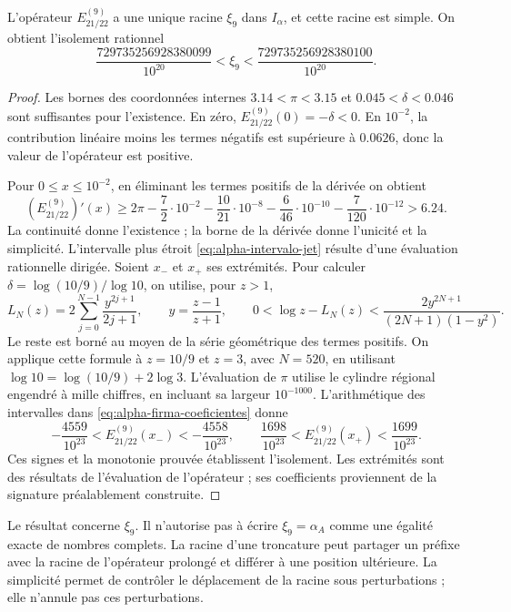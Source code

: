 \begin{proposition}
\label{prop:alpha-raiz-jet}
L'opérateur \(E_{21/22}^{(9)}\) a une unique racine \(\xi_9\) dans \(I_\alpha\), et cette racine est simple. On obtient l'isolement rationnel
\begin{equation}
 \frac{729735256928380099}{10^{20}}
 <\xi_9<\frac{729735256928380100}{10^{20}}.
 \label{eq:alpha-intervalo-jet}
\end{equation}
\end{proposition}

\begin{proof}
Les bornes des coordonnées internes
\(3.14<\pi<3.15\) et
\(0.045<\delta<0.046\) sont suffisantes pour l'existence. En zéro,
\(E_{21/22}^{(9)}(0)=-\delta<0\). En \(10^{-2}\), la contribution
linéaire moins les termes négatifs est supérieure à \(0.0626\), donc la
valeur de l'opérateur est positive.

Pour \(0\leq x\leq10^{-2}\), en éliminant les termes positifs de
la dérivée on obtient
\[
 (E_{21/22}^{(9)})'(x)
 \geq2\pi-\frac72\cdot10^{-2}
 -\frac{10}{21}\cdot10^{-8}-\frac6{46}\cdot10^{-10}
 -\frac7{120}\cdot10^{-12}>6.24.
\]
La continuité donne l'existence ; la borne de la dérivée donne l'unicité et la simplicité. L'intervalle plus étroit \eqref{eq:alpha-intervalo-jet} résulte d'une évaluation rationnelle dirigée. Soient \(x_-\) et \(x_+\) ses extrémités. Pour calculer \(\delta=\log(10/9)/\log 10\), on utilise, pour \(z>1\),
\[
 L_N(z)=2\sum_{j=0}^{N-1}\frac{y^{2j+1}}{2j+1},\qquad
 y=\frac{z-1}{z+1},\qquad
 0<\log z-L_N(z)<\frac{2y^{2N+1}}{(2N+1)(1-y^2)}.
\]
Le reste est borné au moyen de la série géométrique des termes positifs.
On applique cette formule à \(z=10/9\) et \(z=3\), avec \(N=520\),
en utilisant \(\log 10=\log(10/9)+2\log3\). L’évaluation de
\(\pi\) utilise le cylindre régional engendré à mille chiffres, en incluant
sa largeur \(10^{-1000}\). L’arithmétique des intervalles dans
\eqref{eq:alpha-firma-coeficientes} donne
\[
 -\frac{4559}{10^{23}}<E_{21/22}^{(9)}(x_-)< -\frac{4558}{10^{23}},
 \qquad
 \frac{1698}{10^{23}}<E_{21/22}^{(9)}(x_+)<\frac{1699}{10^{23}}.
\]
Ces signes et la monotonie prouvée établissent l’isolement. Les extrémités
sont des résultats de l’évaluation de l’opérateur ; ses coefficients proviennent de
la signature préalablement construite.
\end{proof}

Le résultat concerne \(\xi_9\). Il n'autorise pas à écrire \(\xi_9=\alpha_A\) comme une égalité exacte de nombres complets. La racine d'une troncature peut partager un préfixe avec la racine de l'opérateur prolongé et différer à une position ultérieure. La simplicité permet de contrôler le déplacement de la racine sous perturbations ; elle n'annule pas ces perturbations.

